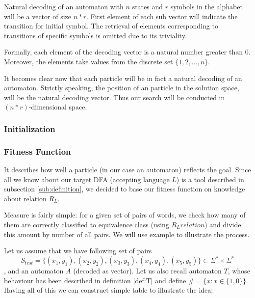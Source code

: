 \documentclass[runningheads,a4paper]{llncs}
\begin{document}
Natural decoding of an automaton with $n$ states and $r$ symbols in the alphabet will be a vector of size $n*r$. First element of each sub vector will indicate the transition for initial symbol. The retrieval of elements corresponding to transitions of specific symbols is omitted due to its triviality.

Formally, each element of the decoding vector is a natural number greater than 0. Moreover, the elements take values from the discrete set $\{1,2, \ldots, n\}$.

It becomes clear now that each particle will be in fact a natural decoding of an automaton. Strictly speaking, the position of an particle in the solution space, will be the natural decoding vector. Thus our search will be conducted in $(n*r)$-dimensional space.


\subsubsection{Initialization}

\subsubsection{Fitness Function}
It describes how well a particle (in our case an automaton) reflects the goal. Since all we know about our target DFA (accepting language $L$) is a tool described in subsection \ref{sub:definition}, we decided to base our fitness function on knowledge about relation $R_{L}$. 

Measure is fairly simple: for a given set of pairs of words, we check how many of them are correctly classified to equivalence class (using $R_{L} relation$) and divide this amount by number of all pairs. We will use example to illustrate the process.

Let us assume that we have following set of pairs
\[
S_{test} = \{(x_1,y_1), (x_2,y_2), (x_3, y_3), (x_4, y_4), (x_5, y_5)\} \subset \Sigma^{*}\times\Sigma^{*} 
\]
, and an automaton $A$ (decoded as vector).
Let us also recall automaton $T$, whose behaviour has been described in definition \ref{def:T} and define $\# = \{ x : x \in \{1 ,0 \}\}$  Having all of this we can construct simple table to illustrate the idea:
\end{document}
